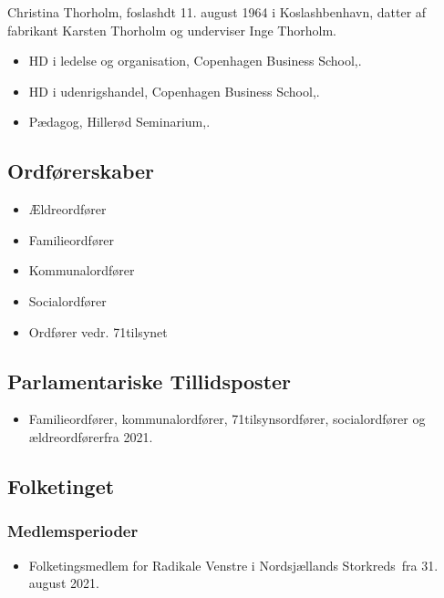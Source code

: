 \documentclass[11pt, a4paper]{awesome-cv}
\begin{document}
\makecvheader[R]
\makelettertitle
\begin{cvletter}
Christina Thorholm, foslashdt 11. august 1964 i Koslashbenhavn, datter af fabrikant Karsten Thorholm og underviser Inge Thorholm.

\begin{itemize}
\item HD i ledelse og organisation, Copenhagen Business School,.
\item HD i udenrigshandel, Copenhagen Business School,.
\item Pædagog, Hillerød Seminarium,.
\end{itemize}
\subsection*{Ordførerskaber}
\begin{itemize}
\item Ældreordfører
\item Familieordfører
\item Kommunalordfører
\item Socialordfører
\item Ordfører vedr.  71tilsynet 
\end{itemize}
\subsection*{Parlamentariske Tillidsposter}
\begin{itemize}
\item Familieordfører, kommunalordfører,  71tilsynsordfører, socialordfører og ældreordførerfra 2021.
\end{itemize}
\subsection*{Folketinget}
\subsubsection*{Medlemsperioder}
\begin{itemize}
\item Folketingsmedlem for Radikale Venstre i Nordsjællands Storkreds fra 31. august 2021.
\end{itemize}

\end{cvletter}
\end{document}
